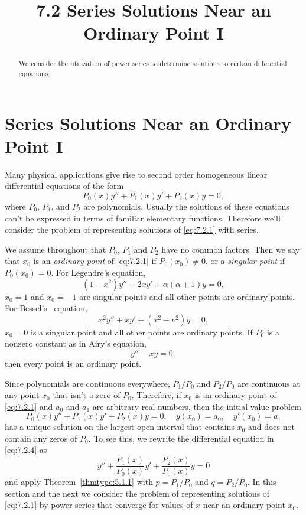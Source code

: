 \documentclass{ximera}
\title{7.2 Series Solutions Near an Ordinary Point I}%
\begin{document}
\begin{abstract}
We consider the utilization of power series to determine solutions to certain differential equations.
\end{abstract}

\maketitle

\section*{Series Solutions Near an Ordinary Point I}

Many physical applications give rise to second order homogeneous
linear  differential equations of the form
\begin{equation}\label{eq:7.2.1}
P_0(x)y''+P_1(x)y'+P_2(x)y=0,
\end{equation}
where $P_0$, $P_1$, and $P_2$ are polynomials. Usually the solutions
of these equations can't be expressed in terms of familiar elementary
functions. Therefore we'll consider the problem of representing
solutions of \eqref{eq:7.2.1} with series.

We assume throughout that $P_0$, $P_1$ and $P_2$ have no common
factors. Then we say that $x_0$ is an \textit{ordinary point} of
\eqref{eq:7.2.1} if $P_0(x_0)\neq0$, or a \textit{singular point} if
$P_0(x_0)=0$. For  Legendre's equation,
\begin{equation}\label{eq:7.2.2}
(1-x^2)y''-2xy'+\alpha(\alpha+1)y=0,
\end{equation}
$x_0=1$ and $x_0=-1$ are singular points and all other points are
ordinary points. For  Bessel's~ equation,
$$
x^2y''+xy'+(x^2-\nu^2)y=0,
$$
$x_0=0$ is a singular point and all other points are ordinary points.
If $P_0$ is a nonzero constant as in  Airy's
equation,
\begin{equation}\label{eq:7.2.3}
y''-xy=0,
\end{equation}
then every point is an ordinary point.

Since polynomials are continuous everywhere, $P_1/P_0$ and $P_2/P_0$
are continuous at any point $x_0$ that isn't  a zero of $P_0$.
Therefore, if $x_0$ is an ordinary point of \eqref{eq:7.2.1} and $a_0$ and
$a_1$ are arbitrary real numbers, then the initial value problem
\begin{equation}\label{eq:7.2.4}
P_0(x)y''+P_1(x)y'+P_2(x)y=0, \quad  y(x_0)=a_0,\quad y'(x_0)=a_1
\end{equation}
has a unique solution on the largest open interval that contains $x_0$
and does not contain any zeros of $P_0$. To see this, we rewrite the
differential equation in \eqref{eq:7.2.4} as
$$
y''+\frac{P_1(x)}{P_0(x)}y'+\frac{P_2(x)}{P_0(x)}y=0
$$
and apply Theorem~\ref{thmtype:5.1.1} with $p=P_1/P_0$ and $q=P_2/P_0$.
In this section and the next we  consider the problem of
representing  solutions of \eqref{eq:7.2.1}  by power series that
converge  for values of $x$  near an ordinary point $x_0$.
\end{document}
